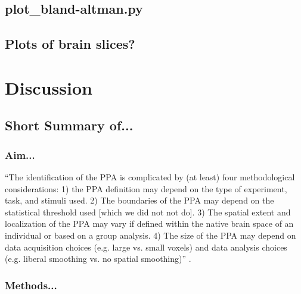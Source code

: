 \subsection{plot\_bland-altman.py}



\subsection{Plots of brain slices?}



\section{Discussion}


\subsection{Short Summary of...}

\subsubsection{Aim...}


``The identification of the PPA is complicated by (at least) four methodological
considerations:
%
1) the PPA definition may depend on the type of experiment, task, and stimuli
used.
%
2) The boundaries of the PPA may depend on the statistical threshold used [which
we did not not do].
%
3) The spatial extent and localization of the PPA may vary if defined within the
native brain space of an individual or based on a group analysis.
%
4) The size of the PPA may depend on data acquisition choices (e.g. large vs.
small voxels) and data analysis choices (e.g. liberal smoothing vs. no spatial
smoothing)'' \citep{weiner2018defining}.



\subsubsection{Methods...}

